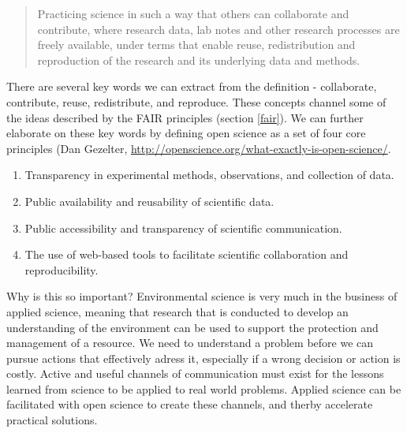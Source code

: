 \documentclass[
]{book}
\providecommand{\tightlist}{%
  \setlength{\itemsep}{0pt}\setlength{\parskip}{0pt}}
\begin{document}
\begin{quote}
Practicing science in such a way that others can collaborate and contribute, where research data, lab notes and other research processes are freely available, under terms that enable reuse, redistribution and reproduction of the research and its underlying data and methods.
\end{quote}

There are several key words we can extract from the definition - collaborate, contribute, reuse, redistribute, and reproduce. These concepts channel some of the ideas described by the FAIR principles (section \ref{fair}). We can further elaborate on these key words by defining open science as a set of four core principles (Dan Gezelter, \url{http://openscience.org/what-exactly-is-open-science/}.

\begin{enumerate}
\def\labelenumi{\arabic{enumi}.}
\tightlist
\item
  Transparency in experimental methods, observations, and collection of data.
\item
  Public availability and reusability of scientific data.
\item
  Public accessibility and transparency of scientific communication.
\item
  The use of web-based tools to facilitate scientific collaboration and reproducibility.
\end{enumerate}

Why is this so important? Environmental science is very much in the business of applied science, meaning that research that is conducted to develop an understanding of the environment can be used to support the protection and management of a resource. We need to understand a problem before we can pursue actions that effectively adress it, especially if a wrong decision or action is costly. Active and useful channels of communication must exist for the lessons learned from science to be applied to real world problems. Applied science can be facilitated with open science to create these channels, and therby accelerate practical solutions.
\end{document}

